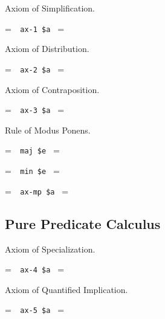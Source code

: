 Axiom of Simplification.\label{ax1}

\setbox\startprefix=\hbox{\tt \ \ ax-1\ \$a\ }
\setbox\contprefix=\hbox{\tt \ \ \ \ \ \ \ \ \ \ }
\startm
\m{\vdash}\m{(}\m{\varphi}\m{\rightarrow}\m{(}\m{\psi}\m{\rightarrow}\m{\varphi}\m{)}
\m{)}
\endm

\noindent Axiom of Distribution.

\setbox\startprefix=\hbox{\tt \ \ ax-2\ \$a\ }
\setbox\contprefix=\hbox{\tt \ \ \ \ \ \ \ \ \ \ }
\startm
\m{\vdash}\m{(}\m{(}\m{\varphi}\m{\rightarrow}\m{(}\m{\psi}\m{\rightarrow}\m{\chi}
\m{)}\m{)}\m{\rightarrow}\m{(}\m{(}\m{\varphi}\m{\rightarrow}\m{\psi}\m{)}\m{
\rightarrow}\m{(}\m{\varphi}\m{\rightarrow}\m{\chi}\m{)}\m{)}\m{)}
\endm

\noindent Axiom of Contraposition.

\setbox\startprefix=\hbox{\tt \ \ ax-3\ \$a\ }
\setbox\contprefix=\hbox{\tt \ \ \ \ \ \ \ \ \ \ }
\startm
\m{\vdash}\m{(}\m{(}\m{\lnot}\m{\varphi}\m{\rightarrow}\m{\lnot}\m{\psi}\m{)}\m{
\rightarrow}\m{(}\m{\psi}\m{\rightarrow}\m{\varphi}\m{)}\m{)}
\endm


\noindent Rule of Modus Ponens.

\setbox\startprefix=\hbox{\tt \ \ maj\ \$e\ }
\setbox\contprefix=\hbox{\tt \ \ \ \ \ \ \ \ \ }
\startm
\m{\vdash}\m{(}\m{\varphi}\m{\rightarrow}\m{\psi}\m{)}
\endm

\setbox\startprefix=\hbox{\tt \ \ min\ \$e\ }
\setbox\contprefix=\hbox{\tt \ \ \ \ \ \ \ \ \ }
\startm
\m{\vdash}\m{\varphi}
\endm

\setbox\startprefix=\hbox{\tt \ \ ax-mp\ \$a\ }
\setbox\contprefix=\hbox{\tt \ \ \ \ \ \ \ \ \ \ \ }
\startm
\m{\vdash}\m{\psi}
\endm


\subsection{Pure Predicate Calculus}

\noindent Axiom of Specialization.

\setbox\startprefix=\hbox{\tt \ \ ax-4\ \$a\ }
\setbox\contprefix=\hbox{\tt \ \ \ \ \ \ \ \ \ \ }
\startm
\m{\vdash}\m{(}\m{\forall}\m{\varphi}\m{\rightarrow}\m{\varphi}\m{)}
\endm

\noindent Axiom of Quantified Implication.

\setbox\startprefix=\hbox{\tt \ \ ax-5\ \$a\ }
\setbox\contprefix=\hbox{\tt \ \ \ \ \ \ \ \ \ \ }
\startm
\m{\vdash}\m{(}\m{\forall}\m{(}\m{\forall}\m{\varphi}\m{\rightarrow}\m{
\psi}\m{)}\m{\rightarrow}\m{(}\m{\forall}\m{\varphi}\m{\rightarrow}\m{
\forall}\m{\psi}\m{)}\m{)}
\endm

